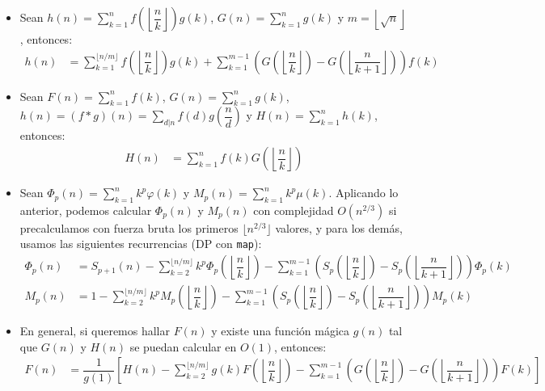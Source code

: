 \documentclass[11pt]{article}
\begin{document}
\begin{itemize}
				\item Sean $\displaystyle h(n) = \sum_{k=1}^{n} f\left(\left\lfloor \dfrac{n}{k} \right\rfloor\right) g(k)$, $\displaystyle G(n)=\sum_{k=1}^{n}g(k)$ y $m=\left\lfloor \sqrt{n} \right\rfloor$, entonces:
				\begin{align*}
					h(n) &= \sum_{k=1}^{\lfloor n/m \rfloor}f\left(\left\lfloor \dfrac{n}{k} \right\rfloor\right) g(k) + \sum_{k=1}^{m-1} \left( G\left(\left\lfloor \dfrac{n}{k} \right\rfloor\right) - G\left(\left\lfloor \dfrac{n}{k+1} \right\rfloor\right) \right)f(k)
				\end{align*}
				
				\item Sean $\displaystyle F(n)=\sum_{k=1}^{n}f(k)$, $\displaystyle G(n)=\sum_{k=1}^{n}g(k)$, $\displaystyle h(n)=(f * g)(n)=\sum_{d | n}f(d)g\left(\dfrac{n}{d}\right)$ y $\displaystyle H(n)=\sum_{k=1}^{n}h(k)$, entonces:
				\begin{align*}
					H(n) &= \sum_{k=1}^{n}f(k)G\left(\left\lfloor \dfrac{n}{k} \right\rfloor\right)
				\end{align*}
				
				\item Sean $\displaystyle \Phi_p(n) = \sum_{k=1}^{n}k^p\varphi(k)$ y $\displaystyle M_p(n) = \sum_{k=1}^{n}k^p\mu(k)$. Aplicando lo anterior, podemos calcular $\Phi_p(n)$ y $M_p(n)$ con complejidad $O(n^{2/3})$ si precalculamos con fuerza bruta los primeros $\lfloor n^{2/3} \rfloor$ valores, y para los demás, usamos las siguientes recurrencias (DP con \texttt{map}):
				{\small
				\begin{align*}
					\Phi_p(n) &= S_{p+1}(n) - \sum_{k=2}^{\lfloor n/m \rfloor} k^p \Phi_p\left(\left\lfloor \dfrac{n}{k}  \right\rfloor\right) - \sum_{k=1}^{m-1} \left( S_p\left(\left\lfloor \dfrac{n}{k} \right\rfloor\right) - S_p\left(\left\lfloor \dfrac{n}{k+1} \right\rfloor\right) \right)\Phi_p(k) \\
					M_p(n) &= 1 - \sum_{k=2}^{\lfloor n/m \rfloor} k^p M_p\left(\left\lfloor \dfrac{n}{k}  \right\rfloor\right) - \sum_{k=1}^{m-1} \left( S_p\left(\left\lfloor \dfrac{n}{k} \right\rfloor\right) - S_p\left(\left\lfloor \dfrac{n}{k+1} \right\rfloor\right) \right)M_p(k)
				\end{align*}
				}
				
				\item En general, si queremos hallar $F(n)$ y existe una función mágica $g(n)$ tal que $G(n)$ y $H(n)$ se puedan calcular en $O(1)$, entonces:
				{\small
				\begin{align*}
					F(n) &= \dfrac{1}{g(1)} \left[ H(n) - \sum_{k=2}^{\lfloor n/m \rfloor} g(k)F\left(\left\lfloor \dfrac{n}{k} \right\rfloor\right) - \sum_{k=1}^{m-1} \left( G\left(\left\lfloor \dfrac{n}{k} \right\rfloor\right) - G\left(\left\lfloor \dfrac{n}{k+1} \right\rfloor\right) \right)F(k) \right]
				\end{align*}
				}
			\end{itemize}
			
\end{document}
